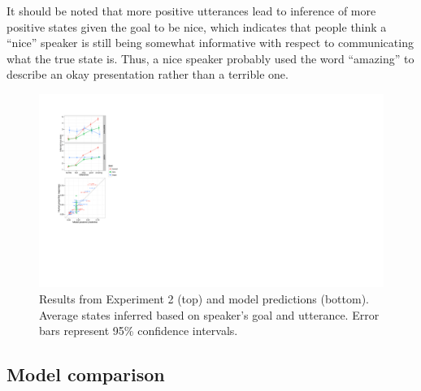 \documentclass[10pt,letterpaper]{article}
\begin{document}
It should be noted that more positive utterances lead to inference of more positive states given the goal to be nice, which indicates that people think a ``nice'' speaker is still being somewhat informative with respect to communicating what the true state is. Thus, a nice speaker probably used the word ``amazing'' to describe an okay presentation rather than a terrible one.

\begin{figure}
\begin{centering} 
\includegraphics[width=\columnwidth]{figures/state-inference-wScatter.pdf}
\caption{\label{fig:exp3} Results from Experiment 2 (top) and model predictions (bottom). Average states inferred based on speaker's goal and utterance. Error bars represent 95\% confidence intervals.}
\end{centering} 
\end{figure}




\subsection{Model comparison}
\end{document}
